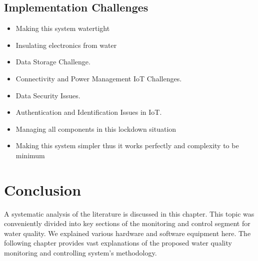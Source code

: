 \subsection{Implementation Challenges}
\begin{itemize}
\item Making this system watertight
\item Insulating electronics from water
\item Data Storage Challenge.
\item Connectivity and Power Management IoT Challenges.
\item Data Security Issues.
\item Authentication and Identification Issues in IoT.
\item Managing all components in this lockdown situation
\item Making this system simpler thus it works perfectly and complexity to be minimum
\end{itemize}

\section{Conclusion}
A systematic analysis of the literature is discussed in this chapter. This topic was conveniently divided into key sections of the monitoring and control segment for water quality. We explained various hardware and software equipment here. The following chapter provides vast explanations of the proposed water quality monitoring and controlling system's methodology.
